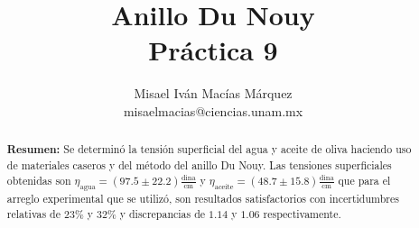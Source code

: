 \documentclass[DIV=calc, paper=a4, fontsize=11pt]{scrartcl}
\title{Anillo Du Nouy\\ %
Práctica 9} %
\author{Misael Iván Macías Márquez\\
misaelmacias@ciencias.unam.mx}
\begin{document}
\maketitle


\begin{abstract}
\textbf{Resumen:} Se determinó  la tensión superficial del agua y aceite de oliva haciendo uso de materiales caseros y del método del anillo Du Nouy. Las tensiones superficiales obtenidas son $\eta_{\text{agua}}=(97.5 \pm 22.2) \frac{\text{dina}}{\text{cm}}$ y $\eta_{\text{aceite}}= (48.7 \pm 15.8) \frac{\text{dina}}{\text{cm}}$ que para el arreglo experimental que se utilizó, son resultados satisfactorios con incertidumbres relativas de $23\%$ y $32\%$ y discrepancias de $1.14$ y $1.06$ respectivamente.
\end{abstract}
\end{document}
